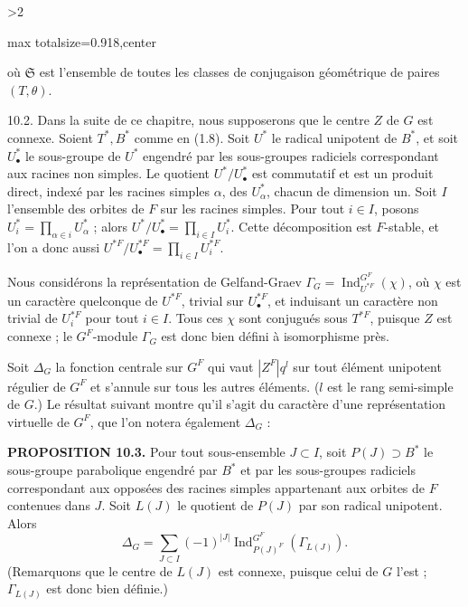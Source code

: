 \documentclass[9pt,twoside]{extarticle}
\newcommand{\EditionPage}[3]{%
  \ifnum#1>2\clearpage\fi
  \pdfbookmark[1]{Printed page #2}{fr-folio-#2}%
  \hypertarget{fr-physical-#1}{}%
  \noindent\begin{adjustbox}{max totalsize={\textwidth}{0.918\textheight},center}
  \begin{minipage}[t]{\textwidth}
  \fontsize{9.4}{11.1}\selectfont\justifying
  #3
  \end{minipage}
  \end{adjustbox}%
}
\begin{document}
\EditionPage{54}{155}{%
où \(\mathfrak S\) est l'ensemble de toutes les classes de conjugaison géométrique de paires \((T,\theta)\).\par

10.2. Dans la suite de ce chapitre, nous supposerons que le centre \(Z\) de \(G\) est connexe. Soient \(T^*,B^*\) comme en (1.8). Soit \(U^*\) le radical unipotent de \(B^*\), et soit \(U_\bullet^*\) le sous-groupe de \(U^*\) engendré par les sous-groupes radiciels correspondant aux racines non simples. Le quotient \(U^*/U_\bullet^*\) est commutatif et est un produit direct, indexé par les racines simples \(\alpha\), des \(U_\alpha^*\), chacun de dimension un. Soit \(I\) l'ensemble des orbites de \(F\) sur les racines simples. Pour tout \(i\in I\), posons \(U_i^*=\prod_{\alpha\in i}U_\alpha^*\) ; alors \(U^*/U_\bullet^*=\prod_{i\in I}U_i^*\). Cette décomposition est \(F\)-stable, et l'on a donc aussi \(U^{*F}/U_\bullet^{*F}=\prod_{i\in I}U_i^{*F}\).\par

Nous considérons la représentation de Gelfand-Graev \(\Gamma_G=\operatorname{Ind}_{U^{*F}}^{G^F}(\chi)\), où \(\chi\) est un caractère quelconque de \(U^{*F}\), trivial sur \(U_\bullet^{*F}\), et induisant un caractère non trivial de \(U_i^{*F}\) pour tout \(i\in I\). Tous ces \(\chi\) sont conjugués sous \(T^{*F}\), puisque \(Z\) est connexe ; le \(G^F\)-module \(\Gamma_G\) est donc bien défini à isomorphisme près.\par

Soit \(\Delta_G\) la fonction centrale sur \(G^F\) qui vaut \(|Z^F|q^l\) sur tout élément unipotent régulier de \(G^F\) et s'annule sur tous les autres éléments. (\(l\) est le rang semi-simple de \(G\).) Le résultat suivant montre qu'il s'agit du caractère d'une représentation virtuelle de \(G^F\), que l'on notera également \(\Delta_G\) :\par

\noindent\textbf{PROPOSITION 10.3.} Pour tout sous-ensemble \(J\subset I\), soit \(P(J)\supset B^*\) le sous-groupe parabolique engendré par \(B^*\) et par les sous-groupes radiciels correspondant aux opposées des racines simples appartenant aux orbites de \(F\) contenues dans \(J\). Soit \(L(J)\) le quotient de \(P(J)\) par son radical unipotent. Alors \[
\tag{10.3.1}
\Delta_G
=
\sum_{J\subset I}(-1)^{|J|}
\operatorname{Ind}_{P(J)^F}^{G^F}(\Gamma_{L(J)}).
\] (Remarquons que le centre de \(L(J)\) est connexe, puisque celui de \(G\) l'est ; \(\Gamma_{L(J)}\) est donc bien définie.)\par

}
\end{document}
